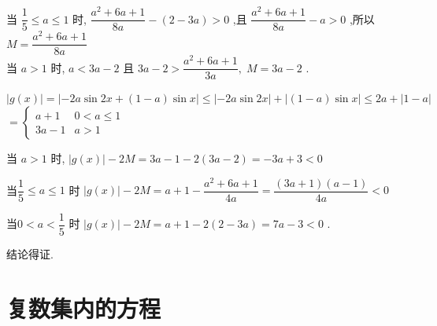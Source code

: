 \begin{enumerate}
\begin{jieda}
\begin{enumerate}
\begin{enumerate}
            当 $ \dfrac{1}{5} \leq  a \leq  1 $ 时, $ \dfrac{{a}^{2} + {6a} + 1}{8a} - \left( {2 - {3a}}\right)  > 0 $ ,且 $ \dfrac{{a}^{2} + {6a} + 1}{8a} - a > 0 $ ,所以 $ M = \dfrac{{a}^{2} + {6a} + 1}{8a} $ \\
            当 $ a > 1 $ 时, $ a < {3a} - 2 $ 且 $ {3a} - 2 > \dfrac{{a}^{2} + {6a} + 1}{3a},\;M = {3a} - 2 $ .
        \end{enumerate}
         $ \left| {g\left( x\right) }\right|  = \left| {-{2a}\sin {2x} + \left( {1 - a}\right) \sin x}\right|  \leq  \left| {-{2a}\sin {2x}}\right|  + \left| {\left( {1 - a}\right) \sin x}\right|  \leq  {2a} + \left| {1 - a}\right| $
            $ = \left\{  \begin{array}{ll} a + 1 & 0 < a \leq  1 \\  {3a} - 1 & a > 1 \end{array}\right. $
            
            当 $ a > 1 $ 时, $ \left| {g\left( x\right) }\right|  - {2M} = {3a} - 1 - 2\left( {{3a} - 2}\right)  =  - {3a} + 3 < 0 $
            
            当$ \dfrac{1}{5} \leq  a \leq  1 $ 时 $ \left| {g\left( x\right) }\right|  - {2M} = a + 1 - \dfrac{{a}^{2} + {6a} + 1}{4a} = \dfrac{\left( {{3a} + 1}\right) \left( {a - 1}\right) }{4a} < 0 $
            
            当$ 0 < a < \dfrac{1}{5} $ 时 $ \left| {g\left( x\right) }\right|  - {2M} = a + 1 - 2\left( {2 - {3a}}\right)  = {7a} - 3 < 0 $ . 
            
            结论得证.
    \end{enumerate}
    \end{jieda}
\end{enumerate}

\section{复数集内的方程}
